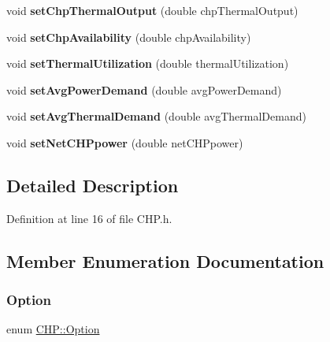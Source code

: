 \begin{DoxyCompactItemize}
\item 
\mbox{\label{class_c_h_p_a4b132e4e600df80fa87c0e7b680733b7}} 
void {\bfseries set\+Chp\+Thermal\+Output} (double chp\+Thermal\+Output)
\item 
\mbox{\label{class_c_h_p_a0dc3c1f0e0b67564a56b5863c1abf974}} 
void {\bfseries set\+Chp\+Availability} (double chp\+Availability)
\item 
\mbox{\label{class_c_h_p_a8917dfa8b8a68244d0ffe3fd3ca1d13f}} 
void {\bfseries set\+Thermal\+Utilization} (double thermal\+Utilization)
\item 
\mbox{\label{class_c_h_p_a4f3183df776744f6871fb59b07553d2c}} 
void {\bfseries set\+Avg\+Power\+Demand} (double avg\+Power\+Demand)
\item 
\mbox{\label{class_c_h_p_a0036fd3fc3154adc0fdba0ede8277bee}} 
void {\bfseries set\+Avg\+Thermal\+Demand} (double avg\+Thermal\+Demand)
\item 
\mbox{\label{class_c_h_p_a625efb308ccd22c8bdf75f082ff7bae2}} 
void {\bfseries set\+Net\+C\+H\+Ppower} (double net\+C\+H\+Ppower)
\end{DoxyCompactItemize}


\subsection{Detailed Description}


Definition at line 16 of file C\+H\+P.\+h.



\subsection{Member Enumeration Documentation}
\mbox{\label{class_c_h_p_ac82f530412021ace928a7e95c1295d06}} 
\subsubsection{\texorpdfstring{Option}{Option}\hspace{0.1cm}{\footnotesize\ttfamily [1/3]}}
{\footnotesize\ttfamily enum \hyperlink{class_c_h_p_ac82f530412021ace928a7e95c1295d06}{C\+H\+P\+::\+Option}\hspace{0.3cm}{\ttfamily [strong]}}


